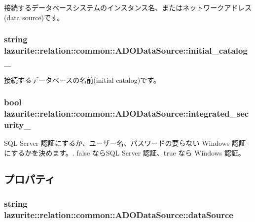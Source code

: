 接続するデータベースシステムのインスタンス名、またはネットワークアドレス(data source)です。 \hypertarget{classlazurite_1_1relation_1_1common_1_1_a_d_o_data_source_a77b26fe47b980f2dfdc29598680c08e7}{
\subsubsection[{initial\_\-catalog\_\-}]{\setlength{\rightskip}{0pt plus 5cm}string {\bf lazurite::relation::common::ADODataSource::initial\_\-catalog\_\-}}}
\label{classlazurite_1_1relation_1_1common_1_1_a_d_o_data_source_a77b26fe47b980f2dfdc29598680c08e7}


接続するデータベースの名前(initial catalog)です。 \hypertarget{classlazurite_1_1relation_1_1common_1_1_a_d_o_data_source_ae5107eca994c597c68b6c73f6055d4fe}{
\subsubsection[{integrated\_\-security\_\-}]{\setlength{\rightskip}{0pt plus 5cm}bool {\bf lazurite::relation::common::ADODataSource::integrated\_\-security\_\-}}}
\label{classlazurite_1_1relation_1_1common_1_1_a_d_o_data_source_ae5107eca994c597c68b6c73f6055d4fe}


SQL Server 認証にするか、ユーザー名、パスワードの要らない Windows 認証にするかを決めます。. false ならSQL Server 認証、true なら Windows 認証。 

\subsection{プロパティ}
\hypertarget{classlazurite_1_1relation_1_1common_1_1_a_d_o_data_source_a69dab29118f44b9d13e20f478c6858a3}{
\subsubsection[{dataSource}]{\setlength{\rightskip}{0pt plus 5cm}string lazurite::relation::common::ADODataSource::dataSource}}
\label{classlazurite_1_1relation_1_1common_1_1_a_d_o_data_source_a69dab29118f44b9d13e20f478c6858a3}


